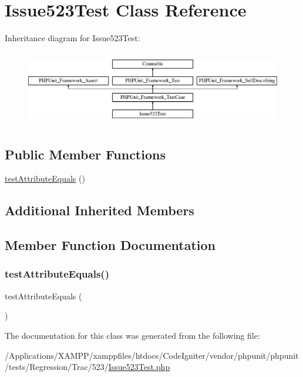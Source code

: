 \hypertarget{class_issue523_test}{}\section{Issue523\+Test Class Reference}
\label{class_issue523_test}
Inheritance diagram for Issue523\+Test\+:\begin{figure}[H]
\begin{center}
\leavevmode
\includegraphics[height=3.303835cm]{class_issue523_test}
\end{center}
\end{figure}
\subsection*{Public Member Functions}
\begin{DoxyCompactItemize}
\item 
\mbox{\hyperlink{class_issue523_test_acd57d0049771d14b3d3687b006d4fe15}{test\+Attribute\+Equals}} ()
\end{DoxyCompactItemize}
\subsection*{Additional Inherited Members}


\subsection{Member Function Documentation}
\mbox{\label{class_issue523_test_acd57d0049771d14b3d3687b006d4fe15}} 
\subsubsection{\texorpdfstring{test\+Attribute\+Equals()}{testAttributeEquals()}}
{\footnotesize\ttfamily test\+Attribute\+Equals (\begin{DoxyParamCaption}{ }\end{DoxyParamCaption})}



The documentation for this class was generated from the following file\+:\begin{DoxyCompactItemize}
\item 
/\+Applications/\+X\+A\+M\+P\+P/xamppfiles/htdocs/\+Code\+Igniter/vendor/phpunit/phpunit/tests/\+Regression/\+Trac/523/\mbox{\hyperlink{_issue523_test_8php}{Issue523\+Test.\+php}}\end{DoxyCompactItemize}
